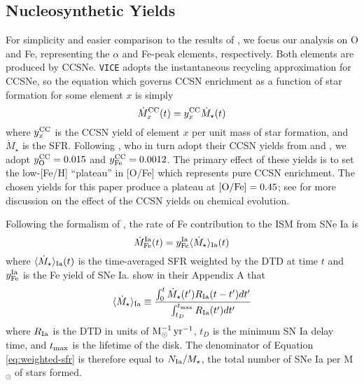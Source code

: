 \documentclass[twocolumn,twocolappendix]{aastex631}
\newcommand{\vice}{{\tt VICE}\xspace}
\begin{document}
\subsection{Nucleosynthetic Yields}
\label{sec:yields}

For simplicity and easier comparison to the results of , we focus our analysis on O and Fe, representing the $\alpha$ and Fe-peak elements, respectively. Both elements are produced by CCSNe. \vice adopts the instantaneous recycling approximation for CCSNe, so the equation which governs CCSN enrichment as a function of star formation for some element $x$ is simply
\begin{equation}
    \dot M_x^{\rm CC}(t) = y_x^{\rm CC} \dot M_\star(t)
    \label{eq:ccsn-enrichment}
\end{equation}
where $y_x^{\rm CC}$ is the CCSN yield of element $x$ per unit mass of star formation, and $\dot M_\star$ is the SFR. Following , who in turn adopt their CCSN yields from \citet{ChieffiLimongi2004-CCSNYields} and \citet{LimongiChieffi2006-CCSNYields}, we adopt $y_{\rm O}^{\rm CC}=0.015$ and $y_{\rm Fe}^{\rm CC}=0.0012$. The primary effect of these yields is to set the low-[Fe/H] ``plateau'' in [O/Fe] which represents pure CCSN enrichment. The chosen yields for this paper produce a plateau at ${\rm [O/Fe]}=0.45$; see \citet{Weinberg2023-CCSNYield} for more discussion on the effect of the CCSN yields on chemical evolution.

Following the formalism of \citet{Weinberg2017-ChemicalEquilibrium}, the rate of Fe contribution to the ISM from SNe Ia is 
\begin{equation}
    \dot M_{\rm Fe}^{\rm Ia}(t) = y_{\rm Fe}^{\rm Ia} \langle \dot M_\star\rangle_{\rm Ia}(t)\\
\end{equation}
where $\langle \dot M_\star\rangle_{\rm Ia}(t)$ is the time-averaged SFR weighted by the DTD at time $t$ and $y_{\rm Fe}^{\rm Ia}$ is the Fe yield of SNe Ia. \citet{Weinberg2017-ChemicalEquilibrium} show in their Appendix A that
\begin{equation}
    \langle \dot M_\star\rangle_{\rm Ia} \equiv \frac{\int_0^t \dot M_\star(t')R_{\rm Ia}(t-t')dt'}{\int_{t_D}^{t_{\rm max}} R_{\rm Ia}(t')dt'}
    \label{eq:weighted-sfr}
\end{equation}
where $R_{\rm Ia}$ is the DTD in units of ${\rm M}_\odot^{-1}\,{\rm yr}^{-1}$, $t_D$ is the minimum SN Ia delay time, and $t_{\rm max}$ is the lifetime of the disk. The denominator of Equation \ref{eq:weighted-sfr} is therefore equal to $N_{\rm Ia}/M_\star$, the total number of SNe Ia per M$_{\odot}$ of stars formed.
\end{document}
